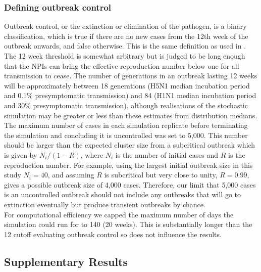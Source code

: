 \documentclass{article}
\begin{document}
\subsubsection*{Defining outbreak control}

Outbreak control, or the extinction or elimination of the pathogen, is a binary classification, which is true if there are no new cases from the 12th week of the outbreak onwards, and false otherwise. This is the same definition as used in \cite{hellewellFeasibilityControllingCOVID192020}. The 12 week threshold is somewhat arbitrary but is judged to be long enough that the NPIs can bring the effective reproduction number below one for all transmission to cease. The number of generations in an outbreak lasting 12 weeks will be approximately between 18 generations (H5N1 median incubation period and 0.1\% presymptomatic transmission) and 84 (H1N1 median incubation period and 30\% presymptomatic transmission), although realisations of the stochastic simulation may be greater or less than these estimates from distribution medians. \\

The maximum number of cases in each simulation replicate before terminating the simulation and concluding it is uncontrolled was set to 5,000. This number should be larger than the expected cluster size from a subcritical outbreak which is given by $N_i / (1 - R)$, where $N_i$ is the number of initial cases and $R$ is the reproduction number. For example, using the largest initial outbreak size in this study $N_i = 40$, and assuming $R$ is subcritical but very close to unity, $R = 0.99$, gives a possible outbreak size of 4,000 cases. Therefore, our limit that 5,000 cases is an uncontrolled outbreak should not include any outbreaks that will go to extinction eventually but produce transient outbreaks by chance. \\

For computational efficiency we capped the maximum number of days the simulation could run for to 140 (20 weeks). This is substantially longer than the 12 cutoff evaluating outbreak control so does not influence the results.

\clearpage

\subsection*{Supplementary Results}
\end{document}
